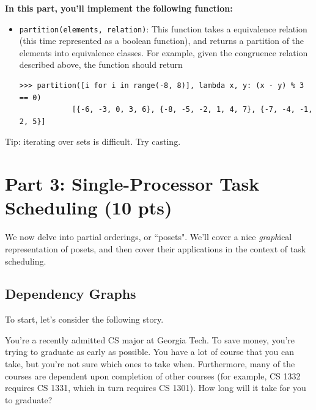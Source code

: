\documentclass{article}
\begin{document}
    \vspace{3mm}
    \begin{tcolorbox}[colback=yellow!30]
        \textbf{In this part, you'll implement the following function:}
        \begin{itemize}
            \item \lstinline{partition(elements, relation)}: This function takes a equivalence relation (this time represented as a boolean function), and returns a partition of the elements into equivalence classes. For example, given the congruence relation described above, the function should return
        \begin{lstlisting}[belowskip=-10pt]
            >>> partition([i for i in range(-8, 8)], lambda x, y: (x - y) % 3 == 0)
            [{-6, -3, 0, 3, 6}, {-8, -5, -2, 1, 4, 7}, {-7, -4, -1, 2, 5}]
        \end{lstlisting}

        \end{itemize}

        Tip: iterating over sets is difficult. Try casting.
    \end{tcolorbox}


\section*{Part 3: Single-Processor Task Scheduling (10 pts)}

    We now delve into partial orderings, or ``posets". We'll cover a nice \textit{graph}ical representation of posets, and then cover their applications in the context of task scheduling. 
    
    \subsection*{Dependency Graphs}
    
    To start, let's consider the following story. 

    \begin{tcolorbox}[colback=red!20]
        You're a recently admitted CS major at Georgia Tech. To save money, you're trying to graduate as early as possible.  You have a lot of course that you can take, but you're not sure which ones to take when. Furthermore, many of the courses are dependent upon completion of other courses (for example, CS 1332 requires CS 1331, which in turn requires CS 1301). How long will it take for you to graduate?
    \end{tcolorbox}
\end{document}
